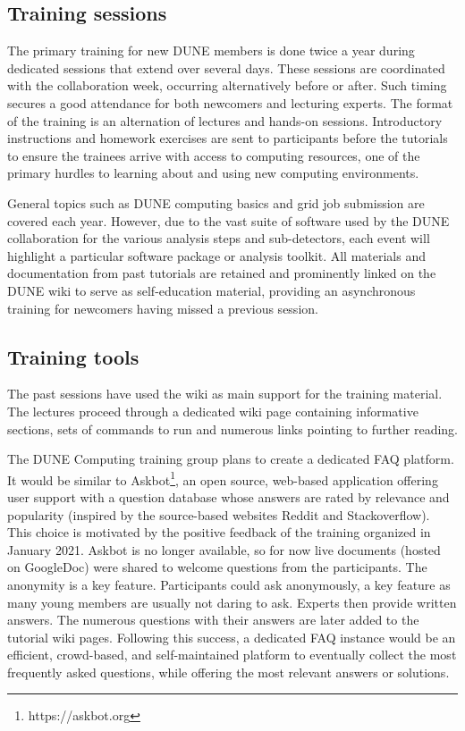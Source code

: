 \documentclass[../main-v1.tex]{subfiles}
\begin{document}

\subsection{Training sessions}
The primary training for new DUNE members is done twice a year during  dedicated sessions that extend over several days. These sessions are coordinated with the collaboration week, occurring alternatively before or after. Such timing secures a good attendance for both newcomers and lecturing experts.
The format of the training is an alternation of lectures and hands-on sessions. Introductory instructions and homework exercises are sent to participants before the tutorials to ensure the trainees arrive with access to computing resources, one of the primary hurdles to learning about and using new computing environments.


General topics such as DUNE computing basics and grid job submission are covered each year. However, due to the vast suite of software used by the DUNE collaboration for the various analysis steps and sub-detectors, each event will highlight a particular software package or analysis toolkit.  All materials and documentation from past tutorials are retained and prominently linked on the DUNE wiki to serve as self-education material, providing an asynchronous training for newcomers having missed a previous session.

\subsection{Training tools}
The past sessions have used the wiki as main support for the training material. The lectures proceed through a dedicated wiki page containing informative sections, sets of commands to run and numerous links pointing to further reading.

The DUNE Computing training group plans to create a dedicated FAQ platform. It would be similar to Askbot\footnote{https://askbot.org}, an open source, web-based application offering user support with a question database whose answers are rated by relevance and popularity (inspired by the source-based websites Reddit and Stackoverflow). This choice is motivated by the positive feedback of the training organized in January 2021. Askbot is no longer available, so for now live documents (hosted on GoogleDoc) were shared to welcome questions from the participants. The anonymity is a key feature. Participants could ask anonymously, a key feature as many young members are usually not daring to ask. Experts then provide written answers. The numerous questions with their answers are later added to the tutorial wiki pages. Following this success, a dedicated FAQ instance would be an efficient, crowd-based, and self-maintained platform to eventually collect the most frequently asked questions, while offering the most relevant answers or solutions.
\end{document}
